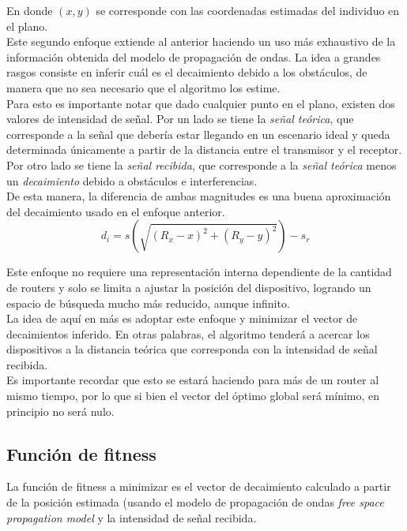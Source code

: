 \documentclass[journal]{IEEEtran}
\begin{document}
En donde $(x,y)$ se corresponde con las coordenadas estimadas del individuo en el plano.\\

Este segundo enfoque extiende al anterior haciendo un uso más exhaustivo de la información obtenida del modelo de propagación de ondas. La idea a grandes rasgos consiste en inferir cuál es el decaimiento debido a los obstáculos, de manera que no sea necesario que el algoritmo los estime.\\

Para esto es importante notar que dado cualquier punto en el plano, existen dos valores de intensidad de señal. Por un lado se tiene la \emph{señal teórica}, que corresponde a la señal que debería estar llegando en un escenario ideal y queda determinada únicamente a partir de la distancia entre el transmisor y el receptor. Por otro lado se tiene la \emph{señal recibida}, que corresponde a la \emph{señal teórica} menos un \emph{decaimiento} debido a obstáculos e interferencias.\\

De esta manera, la diferencia de ambas magnitudes es una buena aproximación del decaimiento usado en el enfoque anterior.\\

$$d_i = s(\sqrt{(R_x-x)^2+(R_y-y)^2}) - s_r$$

Este enfoque no requiere una representación interna dependiente de la cantidad de routers y solo se limita a ajustar la posición del dispositivo, logrando un espacio de búsqueda mucho más reducido, aunque infinito.\\

La idea de aquí en más es adoptar este enfoque y minimizar el vector de decaimientos inferido. En otras palabras, el algoritmo tenderá a acercar los dispositivos a la distancia teórica que corresponda con la intensidad de señal recibida.\\

Es importante recordar que esto se estará haciendo para más de un router al mismo tiempo, por lo que si bien el vector del óptimo global será mínimo, en principio no será nulo.\\

\subsection{Función de fitness}

La función de fitness a minimizar es el vector de decaimiento calculado a partir de la posición estimada (usando el modelo de propagación de ondas \emph{free space propagation model} y la intensidad de señal recibida.\\
\end{document}
